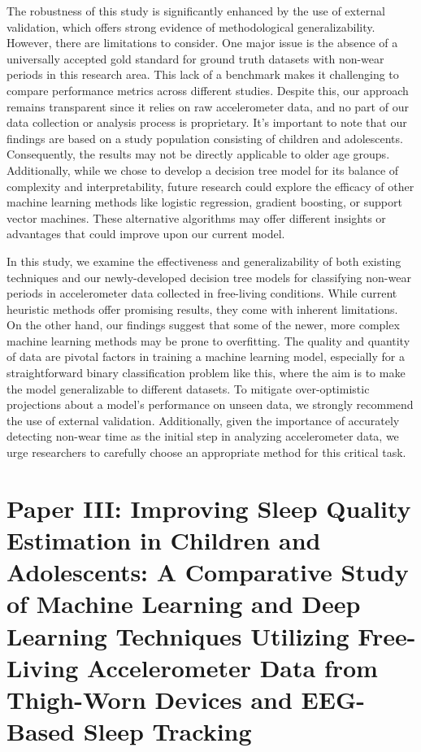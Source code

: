 \documentclass[
  10pt,
]{scrbook}
\begin{document}
The robustness of this study is significantly enhanced by the use of
external validation, which offers strong evidence of methodological
generalizability. However, there are limitations to consider. One major
issue is the absence of a universally accepted gold standard for ground
truth datasets with non-wear periods in this research area. This lack of
a benchmark makes it challenging to compare performance metrics across
different studies. Despite this, our approach remains transparent since
it relies on raw accelerometer data, and no part of our data collection
or analysis process is proprietary. It's important to note that our
findings are based on a study population consisting of children and
adolescents. Consequently, the results may not be directly applicable to
older age groups. Additionally, while we chose to develop a decision
tree model for its balance of complexity and interpretability, future
research could explore the efficacy of other machine learning methods
like logistic regression, gradient boosting, or support vector machines.
These alternative algorithms may offer different insights or advantages
that could improve upon our current model.

In this study, we examine the effectiveness and generalizability of both
existing techniques and our newly-developed decision tree models for
classifying non-wear periods in accelerometer data collected in
free-living conditions. While current heuristic methods offer promising
results, they come with inherent limitations. On the other hand, our
findings suggest that some of the newer, more complex machine learning
methods may be prone to overfitting. The quality and quantity of data
are pivotal factors in training a machine learning model, especially for
a straightforward binary classification problem like this, where the aim
is to make the model generalizable to different datasets. To mitigate
over-optimistic projections about a model's performance on unseen data,
we strongly recommend the use of external validation. Additionally,
given the importance of accurately detecting non-wear time as the
initial step in analyzing accelerometer data, we urge researchers to
carefully choose an appropriate method for this critical task.

\hypertarget{paper-iii-improving-sleep-quality-estimation-in-children-and-adolescents-a-comparative-study-of-machine-learning-and-deep-learning-techniques-utilizing-free-living-accelerometer-data-from-thigh-worn-devices-and-eeg-based-sleep-tracking}{%
\chapter{Paper III: Improving Sleep Quality Estimation in Children and
Adolescents: A Comparative Study of Machine Learning and Deep Learning
Techniques Utilizing Free-Living Accelerometer Data from Thigh-Worn
Devices and EEG-Based Sleep
Tracking}\label{paper-iii-improving-sleep-quality-estimation-in-children-and-adolescents-a-comparative-study-of-machine-learning-and-deep-learning-techniques-utilizing-free-living-accelerometer-data-from-thigh-worn-devices-and-eeg-based-sleep-tracking}}
\end{document}
